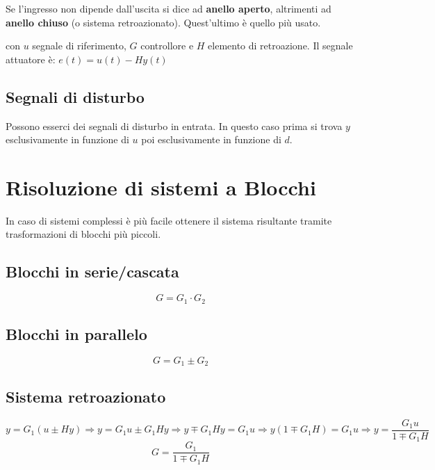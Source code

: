 Se l'ingresso non dipende dall'uscita si dice ad \textbf{anello aperto}, altrimenti ad \textbf{anello chiuso} (o sistema retroazionato). Quest'ultimo è quello più usato.

\begin{center}
	
\end{center}	
	con $ u $ segnale di riferimento, $ G $ controllore e $ H $ elemento di retroazione. Il segnale attuatore è: $ e(t)=u(t)-Hy(t) $
	
\subsection{Segnali di disturbo}

Possono esserci dei segnali di disturbo in entrata. In questo caso prima si trova $ y $ esclusivamente in funzione di $ u $ poi esclusivamente in funzione di $ d $. %

\begin{center}
	
\end{center}

\section{Risoluzione di sistemi a Blocchi}
In caso di sistemi complessi è più facile ottenere il sistema risultante tramite trasformazioni di blocchi più piccoli.

\subsection{Blocchi in serie/cascata}
\begin{center}
	
\end{center}

\[
	G=G_1 \cdot G_2
\]

\subsection{Blocchi in parallelo}
\begin{center}
	
\end{center}

\[
G=G_1 \pm G_2
\]


\subsection{Sistema retroazionato}
\begin{center}
	
\end{center}
\[
	y= G_1(u \pm Hy) 
	\Rightarrow y = G_1 u \pm G_1 Hy
	\Rightarrow y \mp G_1 Hy= G_1 u 
	\Rightarrow y(1\mp G_1 H)= G_1 u
	\Rightarrow y= \frac{G_1 u}{1\mp G_1 H}	
\]
\[
	G = \frac{G_1 }{1\mp G_1 H}
\]


